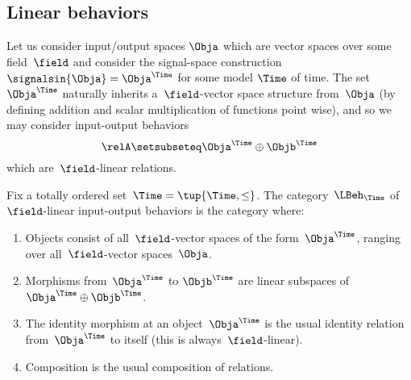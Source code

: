 



\subsection{Linear behaviors}

Let us consider input/output spaces $\Obja$ which are vector spaces over some field~$\field$ and consider the signal-space construction $\signalsin{\Obja} = \Obja^\Time$ for some model $\Time$ of time.
The set $\Obja^\Time$ naturally inherits a~$\field$-vector space structure from~$\Obja$ (by defining addition and scalar multiplication of functions point wise), and so we may consider input-output behaviors
\begin{equation}
    \relA \setsubseteq \Obja^\Time \oplus \Objb^\Time
\end{equation}
which are~$\field$-linear relations.

\begin{definition}
    Fix a totally ordered set~$\Time = \tup{\Time, \leq}$.
    The category~$\LBeh_\Time$ of~$\field$-linear input-output behaviors is the category where:
    \begin{enumerate}
        \item Objects consist of all~$\field$-vector spaces of the form~$\Obja^\Time$, ranging over all~$\field$-vector spaces~$\Obja$.
        \item Morphisms from~$\Obja^\Time$ to $\Objb^\Time$ are linear subspaces of~$\Obja^\Time \oplus \Objb^\Time$.
        \item The identity morphism at an object~$\Obja^\Time$ is the usual identity relation from~$\Obja^\Time$ to itself (this is always~$\field$-linear).
        \item Composition is the usual composition of relations.
    \end{enumerate}
\end{definition}

